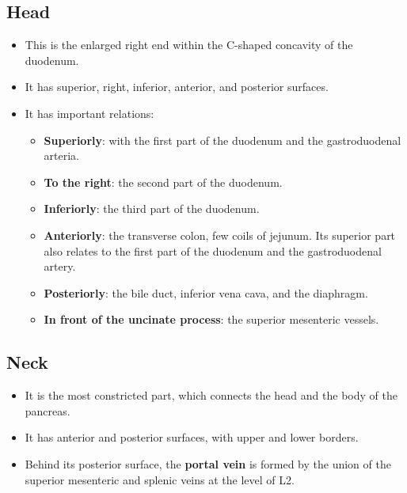 \documentclass[11pt, a4paper]{article}
\begin{document}
\subsection{Head}
\begin{itemize}
    \item This is the enlarged right end within the C-shaped concavity of the duodenum.
    \item It has superior, right, inferior, anterior, and posterior surfaces.
    \item It has important relations:
    \begin{itemize}
        \item \textbf{Superiorly}: with the first part of the duodenum and the gastroduodenal arteria.
        \item \textbf{To the right}: the second part of the duodenum.
        \item \textbf{Inferiorly}: the third part of the duodenum.
        \item \textbf{Anteriorly}: the transverse colon, few coils of jejunum. Its superior part also relates to the first part of the duodenum and the gastroduodenal artery.
        \item \textbf{Posteriorly}: the bile duct, inferior vena cava, and the diaphragm.
        \item \textbf{In front of the uncinate process}: the superior mesenteric vessels.
    \end{itemize}
\end{itemize}

\subsection{Neck}
\begin{itemize}
    \item It is the most constricted part, which connects the head and the body of the pancreas.
    \item It has anterior and posterior surfaces, with upper and lower borders.
    \item Behind its posterior surface, the \textbf{portal vein} is formed by the union of the superior mesenteric and splenic veins at the level of L2.
\end{itemize}
\end{document}
